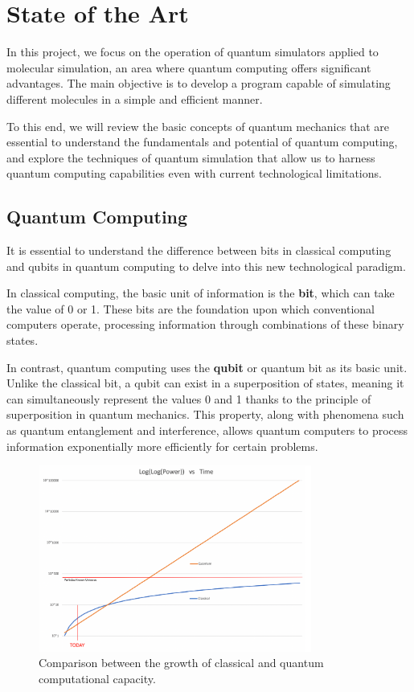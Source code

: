\chapter[State of the Art]{State of the Art}

In this project, we focus on the operation of quantum simulators applied to molecular simulation, an area where quantum computing offers significant advantages. The main objective is to develop a program capable of simulating different molecules in a simple and efficient manner.

To this end, we will review the basic concepts of quantum mechanics that are essential to understand the fundamentals and potential of quantum computing, and explore the techniques of quantum simulation that allow us to harness quantum computing capabilities even with current technological limitations.

\section{Quantum Computing}

It is essential to understand the difference between bits in classical computing and qubits in quantum computing to delve into this new technological paradigm.

In classical computing, the basic unit of information is the \textbf{bit}, which can take the value of 0 or 1. These bits are the foundation upon which conventional computers operate, processing information through combinations of these binary states.

In contrast, quantum computing uses the \textbf{qubit} or quantum bit as its basic unit. Unlike the classical bit, a qubit can exist in a superposition of states, meaning it can simultaneously represent the values 0 and 1 thanks to the principle of superposition in quantum mechanics. This property, along with phenomena such as quantum entanglement and interference, allows quantum computers to process information exponentially more efficiently for certain problems.

\begin{figure}[H]
    \centering
    \includegraphics[width=0.8\textwidth]{img/bit_vs_qbit.png}
    \caption{Comparison between the growth of classical and quantum computational capacity.\cite{mooreslaw}}
    \label{fig:bit_vs_qubit}
\end{figure}

